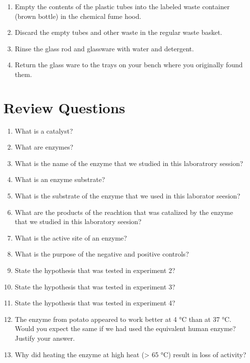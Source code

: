 \documentclass[]{book}
\providecommand{\tightlist}{%
  \setlength{\itemsep}{0pt}\setlength{\parskip}{0pt}}
\theoremstyle{definition}
\theoremstyle{definition}
\theoremstyle{definition}
\theoremstyle{remark}
\begin{document}
\begin{enumerate}
\def\labelenumi{\arabic{enumi}.}
\tightlist
\item
  Empty the contents of the plastic tubes into the labeled waste
  container (brown bottle) in the chemical fume hood.
\item
  Discard the empty tubes and other waste in the regular waste basket.
\item
  Rinse the glass rod and glassware with water and detergent.
\item
  Return the glass ware to the trays on your bench where you originally
  found them.
\end{enumerate}

\section{Review Questions}\label{review-questions-4}

\begin{enumerate}
\def\labelenumi{\arabic{enumi}.}
\tightlist
\item
  What is a catalyst?
\item
  What are enzymes?
\item
  What is the name of the enzyme that we studied in this laboratrory
  session?
\item
  What is an enzyme substrate?
\item
  What is the substrate of the enzyme that we used in this laborator
  seesion?
\item
  What are the products of the reachtion that was catalized by the
  enzyme that we studied in this laboratory seesion?
\item
  What is the active site of an enzyme?
\item
  What is the purpose of the negative and positive controls?
\item
  State the hypothesis that was tested in experiment 2?
\item
  State the hypothesis that was tested in experiment 3?
\item
  State the hypothesis that was tested in experiment 4?
\item
  The enzyme from potato appeared to work better at 4 °C than at 37 °C.
  Would you expect the same if we had used the equivalent human enzyme?
  Justify your answer.
\item
  Why did heating the enzyme at high heat (\textgreater{} 65 °C) result
  in loss of activity?
\end{enumerate}
\end{document}
